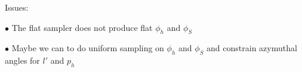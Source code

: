 \documentclass[floatfix,aps,prd,nofootinbib,superscriptaddress,preprint]{revtex4}
\newcommand\3[1]{\boldsymbol{#1}}
\begin{document}
{\color{red} 
Issues:

$\bullet$ The flat sampler does not produce flat $\phi_h$ and $\phi_S$ 

$\bullet$ Maybe we can to do uniform sampling on $\phi_h$ and $\phi_S$
and constrain azymuthal angles for $l'$ and $p_h$

}
 
%
%
\end{document}
